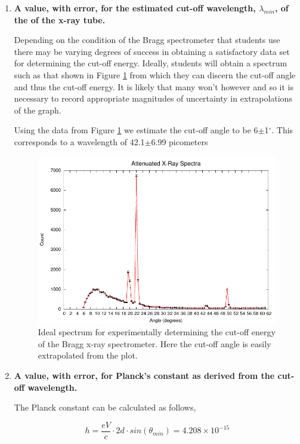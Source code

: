 \begin{enumerate}
\item {\bf A value, with error, for the estimated cut-off wavelength, $\lambda_{min}$, of the of the x-ray tube.}\newline

Depending on the condition of the Bragg spectrometer that students use there may be varying degrees of success in obtaining a satisfactory data set for determining the cut-off energy. Ideally, students will obtain a spectrum such as that shown in Figure \ref{fig:xrcg4} from which they can discern the cut-off angle and thus the cut-off energy. It is likely that many won't however and so it is necessary to record appropriate magnitudes of uncertainty in extrapolations of the graph. 

Using the data from Figure \ref{fig:xrcg4} we estimate the cut-off angle to be 6$\pm$1$^{\circ}$. This corresponds to a wavelength of 42.1$\pm$6.99 picometers

\begin{figure}
\includegraphics{HugoData-Angle.pdf}
\caption{Ideal spectrum for experimentally determining the cut-off energy of the Bragg x-ray spectrometer. Here the cut-off angle is easily extrapolated from the plot.}
\label{fig:xrcg4}
\end{figure}

\item {\bf A value, with error, for Planck's constant as derived from the cut-off wavelength.}\newline

The Planck constant can be calculated as follows,

\begin{equation}
h=\dfrac{eV}{c}\cdot 2d\cdot sin(\theta_{min})=4.208\times10^{-15}
\label{equ:twcg3}
\end{equation}


\end{enumerate}
